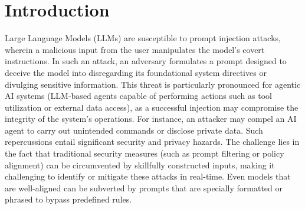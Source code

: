 \documentclass[manuscript,screen,review]{acmart}
\begin{document}



\maketitle

\section{Introduction}
\label{sec:introduction}
Large Language Models (LLMs) are susceptible to prompt injection attacks, wherein a malicious input from the user manipulates the model's covert instructions. In such an attack, an adversary formulates a prompt designed to deceive the model into disregarding its foundational system directives or divulging sensitive information. This threat is particularly pronounced for agentic AI systems (LLM-based agents capable of performing actions such as tool utilization or external data access), as a successful injection may compromise the integrity of the system's operations. For instance, an attacker may compel an AI agent to carry out unintended commands or disclose private data. Such repercussions entail significant security and privacy hazards. The challenge lies in the fact that traditional security measures (such as prompt filtering or policy alignment) can be circumvented by skillfully constructed inputs, making it challenging to identify or mitigate these attacks in real-time. Even models that are well-aligned can be subverted by prompts that are specially formatted or phrased to bypass predefined rules.
\end{document}
